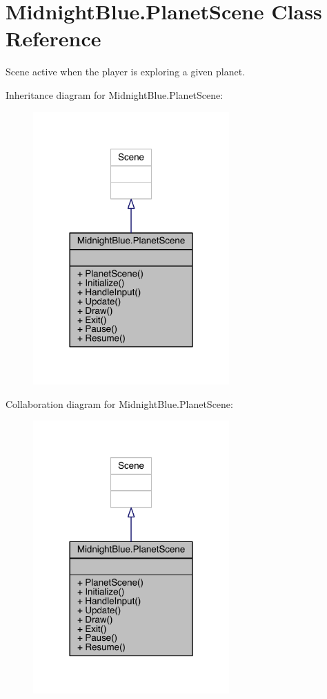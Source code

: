 \hypertarget{class_midnight_blue_1_1_planet_scene}{}\section{Midnight\+Blue.\+Planet\+Scene Class Reference}
\label{class_midnight_blue_1_1_planet_scene}


Scene active when the player is exploring a given planet.  




Inheritance diagram for Midnight\+Blue.\+Planet\+Scene\+:
\nopagebreak
\begin{figure}[H]
\begin{center}
\leavevmode
\includegraphics[width=213pt]{class_midnight_blue_1_1_planet_scene__inherit__graph}
\end{center}
\end{figure}


Collaboration diagram for Midnight\+Blue.\+Planet\+Scene\+:
\nopagebreak
\begin{figure}[H]
\begin{center}
\leavevmode
\includegraphics[width=213pt]{class_midnight_blue_1_1_planet_scene__coll__graph}
\end{center}
\end{figure}
